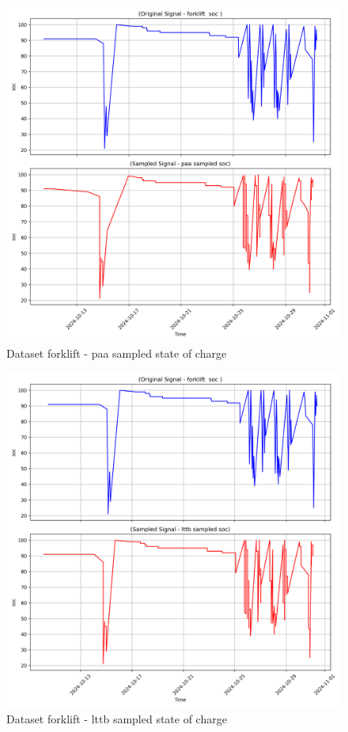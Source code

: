 \begin{figure}
    \centering
    \includegraphics[width=1\linewidth]{screenshots/forklift/paa_sampled_soc_screenshot.png}
    \caption{Dataset forklift - paa sampled state of charge }
    \label{fig:forklift_paa_sampled_soc_screenshot}
\end{figure}
\begin{figure}
    \centering
    \includegraphics[width=1\linewidth]{screenshots/forklift/lttb_sampled_soc_screenshot.png}
    \caption{Dataset forklift - lttb sampled state of charge }
    \label{fig:forklift_lttb_sampled_soc_screenshot}
\end{figure}
